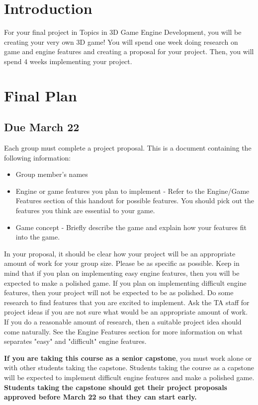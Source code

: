 \documentclass{../cs195u}
\begin{document}
  
\section*{Introduction}
For your final project in Topics in 3D Game Engine Development, you will be creating your very own 3D game! You will spend one week doing research on game and engine features and creating a proposal for your project. Then, you will spend 4 weeks implementing your project.
  
 \section*{Final Plan}
 \subsection*{Due March 22}
  Each group must complete a project proposal. This is a document containing the following information:
  
  \begin{itemize}
  	\item Group member's names
	\item Engine or game features you plan to implement - Refer to the Engine/Game Features section of this handout for possible features. You should pick out the features you think are essential to your game. 
	\item Game concept - Briefly describe the game and explain how your features fit into the game. 
  \end{itemize}

In your proposal, it should be clear how your project will be an appropriate amount of work for your group size. Please be as specific as possible. Keep in mind that if you plan on implementing easy engine features, then you will be expected to make a polished game. If you plan on implementing difficult engine features, then your project will not be expected to be as polished. Do some research to find features that you are excited to implement. Ask the TA staff for project ideas if you are not sure what would be an appropriate amount of work. If you do a reasonable amount of research, then a suitable project idea should come naturally. See the Engine Features section for more information on what separates "easy" and "difficult" engine features.

\textbf{If you are taking this course as a senior capstone}, you must work alone or with other students taking the capstone. Students taking the course as a capstone will be expected to implement difficult engine features and make a polished game. \textbf{Students taking the capstone should get their project proposals approved before March 22 so that they can start early.}
\end{document}
